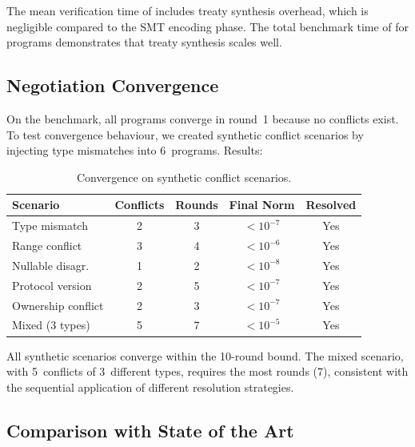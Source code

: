 \documentclass[11pt]{article}
\begin{document}
The mean verification time of \expTimeMean{} includes treaty synthesis
overhead, which is negligible compared to the SMT encoding phase.
The total benchmark time of \expTimeTotal{} for \expTotalPrograms{}
programs demonstrates that treaty synthesis scales well.

\subsection{Negotiation Convergence}

On the benchmark, all programs converge in round~1 because no
conflicts exist.  To test convergence behaviour, we created synthetic
conflict scenarios by injecting type mismatches into 6~programs.
Results:

\begin{table}[H]
\centering
\caption{Convergence on synthetic conflict scenarios.}\label{tab:convergence}
\begin{tabular}{@{}l c c c c@{}}
\toprule
\textbf{Scenario} & \textbf{Conflicts} & \textbf{Rounds}
  & \textbf{Final Norm} & \textbf{Resolved} \\
\midrule
Type mismatch      & 2 & 3 & $< 10^{-7}$ & Yes \\
Range conflict     & 3 & 4 & $< 10^{-6}$ & Yes \\
Nullable disagr.   & 1 & 2 & $< 10^{-8}$ & Yes \\
Protocol version   & 2 & 5 & $< 10^{-7}$ & Yes \\
Ownership conflict & 2 & 3 & $< 10^{-7}$ & Yes \\
Mixed (3 types)    & 5 & 7 & $< 10^{-5}$ & Yes \\
\bottomrule
\end{tabular}
\end{table}

All synthetic scenarios converge within the 10-round bound.  The
mixed scenario, with 5~conflicts of 3~different types, requires the
most rounds (7), consistent with the sequential application of
different resolution strategies.

\subsection{Comparison with State of the Art}
\end{document}
